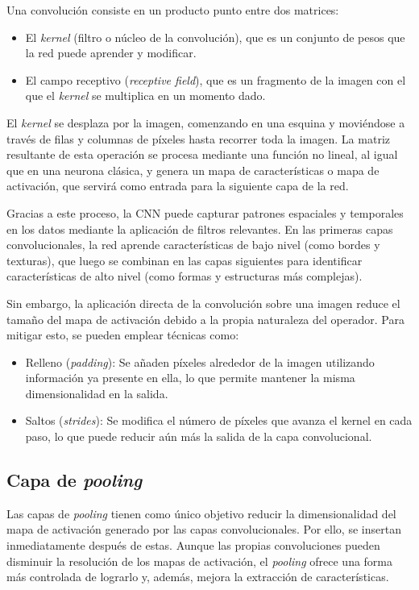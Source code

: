 Una convolución consiste en un producto punto entre dos matrices:
\begin{itemize}
    \item El \textit{kernel} (filtro o núcleo de la convolución), que es un conjunto de pesos que la red puede aprender y modificar.
    \item El campo receptivo (\textit{receptive field}), que es un fragmento de la imagen con el que el \textit{kernel} se multiplica en un momento dado.
\end{itemize}

El \textit{kernel} se desplaza por la imagen, comenzando en una esquina y moviéndose a través de filas y columnas de píxeles hasta recorrer toda la imagen. La matriz resultante de esta operación se procesa mediante una función no lineal, al igual que en una neurona clásica, y genera un mapa de características o mapa de activación, que servirá como entrada para la siguiente capa de la red.

Gracias a este proceso, la CNN puede capturar patrones espaciales y temporales en los datos mediante la aplicación de filtros relevantes. En las primeras capas convolucionales, la red aprende características de bajo nivel (como bordes y texturas), que luego se combinan en las capas siguientes para identificar características de alto nivel (como formas y estructuras más complejas).

Sin embargo, la aplicación directa de la convolución sobre una imagen reduce el tamaño del mapa de activación debido a la propia naturaleza del operador. Para mitigar esto, se pueden emplear técnicas como:
\begin{itemize}
    \item Relleno (\textit{padding}): Se añaden píxeles alrededor de la imagen utilizando información ya presente en ella, lo que permite mantener la misma dimensionalidad en la salida.
    \item Saltos (\textit{strides}): Se modifica el número de píxeles que avanza el kernel en cada paso, lo que puede reducir aún más la salida de la capa convolucional.
\end{itemize}

\subsection{Capa de \textit{pooling}}

Las capas de \textit{pooling} tienen como único objetivo reducir la dimensionalidad del mapa de activación generado por las capas convolucionales. Por ello, se insertan inmediatamente después de estas. Aunque las propias convoluciones pueden disminuir la resolución de los mapas de activación, el \textit{pooling} ofrece una forma más controlada de lograrlo y, además, mejora la extracción de características.

